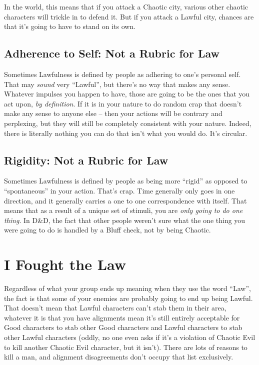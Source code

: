 In the world, this means that if you attack a Chaotic city, various other chaotic characters will trickle in to defend it. But if you attack a Lawful city, chances are that it's going to have to stand on its own.

\subsection{Adherence to Self: Not a Rubric for Law}
Sometimes Lawfulness is defined by people as adhering to one's personal self. That may \textit{sound} very ``Lawful'', but there's no way that makes any sense. Whatever impulses you happen to have, those are going to be the ones that you act upon, \textit{by definition}. If it is in your nature to do random crap that doesn't make any sense to anyone else -- then your actions will be contrary and perplexing, but they will still be completely consistent with your nature. Indeed, there is literally nothing you can do that isn't what you would do. It's circular.

\subsection{Rigidity: Not a Rubric for Law}
Sometimes Lawfulness is defined by people as being more ``rigid'' as opposed to ``spontaneous'' in your action. That's crap. Time generally only goes in one direction, and it generally carries a one to one correspondence with itself. That means that as a result of a unique set of stimuli, you are \textit{only going to do one thing}. In D\&D, the fact that other people weren't sure what the one thing you were going to do is handled by a Bluff check, not by being Chaotic.


\section{I Fought the Law}

Regardless of what your group ends up meaning when they use the word ``Law'', the fact is that some of your enemies are probably going to end up being Lawful. That doesn't mean that Lawful characters can't stab them in their area, whatever it is that you have alignments mean it's still entirely acceptable for Good characters to stab other Good characters and Lawful characters to stab other Lawful characters (oddly, no one even asks if it's a violation of Chaotic Evil to kill another Chaotic Evil character, but it isn't). There are lots of reasons to kill a man, and alignment disagreements don't occupy that list exclusively.


